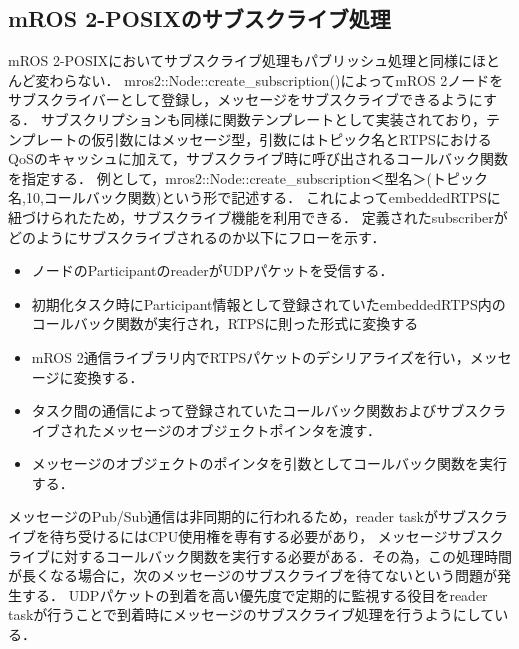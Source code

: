 \subsection{mROS 2-POSIXのサブスクライブ処理}
mROS 2-POSIXにおいてサブスクライブ処理もパブリッシュ処理と同様にほとんど変わらない．
mros2::Node::create\_subscription()によってmROS 2ノードをサブスクライバーとして登録し，メッセージをサブスクライブできるようにする．
サブスクリプションも同様に関数テンプレートとして実装されており，テンプレートの仮引数にはメッセージ型，引数にはトピック名とRTPSにおけるQoSのキャッシュに加えて，サブスクライブ時に呼び出されるコールバック関数を指定する．
例として，mros2::Node::create\_subscription＜型名＞(トピック名,10,コールバック関数)という形で記述する．
これによってembeddedRTPSに紐づけられたため，サブスクライブ機能を利用できる．
定義されたsubscriberがどのようにサブスクライブされるのか以下にフローを示す．
\begin{itemize}
    \item ノードのParticipantのreaderがUDPパケットを受信する．
    \item 初期化タスク時にParticipant情報として登録されていたembeddedRTPS内のコールバック関数が実行され，RTPSに則った形式に変換する
    \item mROS 2通信ライブラリ内でRTPSパケットのデシリアライズを行い，メッセージに変換する．
    \item タスク間の通信によって登録されていたコールバック関数およびサブスクライブされたメッセージのオブジェクトポインタを渡す．
    \item メッセージのオブジェクトのポインタを引数としてコールバック関数を実行する．
\end{itemize}
メッセージのPub/Sub通信は非同期的に行われるため，reader taskがサブスクライブを待ち受けるにはCPU使用権を専有する必要があり，
メッセージサブスクライブに対するコールバック関数を実行する必要がある．その為，この処理時間が長くなる場合に，次のメッセージのサブスクライブを待てないという問題が発生する．
UDPパケットの到着を高い優先度で定期的に監視する役目をreader taskが行うことで到着時にメッセージのサブスクライブ処理を行うようにしている．
